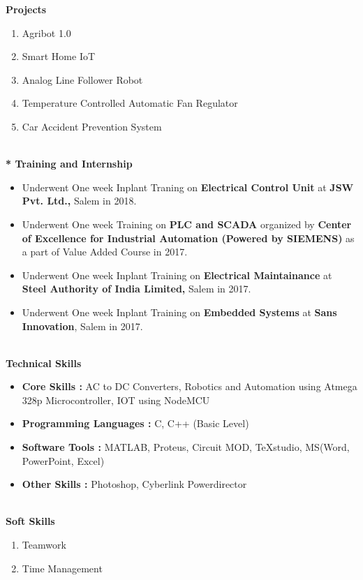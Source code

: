 \documentclass{article}
\begin{document}
	\begin{flushleft}
		\large \textbf{Projects}
		\begin{enumerate}
				\setlength\itemsep{0.01em}
			\item Agribot 1.0
			\item Smart Home IoT
			\item Analog Line Follower Robot
			\item Temperature Controlled Automatic Fan Regulator
			\item Car Accident Prevention System
		\end{enumerate}
		\large \textbf{\\* Training and Internship}\
		\begin{itemize}
		\justifying
			\setlength\itemsep{0.01em}
			\item Underwent One week Inplant Traning on \textbf{Electrical Control Unit} at \textbf{JSW Pvt. Ltd.,} Salem in 2018.
			\item Underwent One week Training on \textbf{PLC and SCADA} organized by \textbf{Center of Excellence for Industrial Automation (Powered by SIEMENS)} as a part of Value Added Course in 2017. 
			\item Underwent One week Inplant Training on \textbf{Electrical Maintainance} at \textbf{Steel Authority of India Limited,} Salem in 2017.
			\item Underwent One week Inplant Training on \textbf{Embedded Systems} at \textbf{Sans Innovation}, Salem in 2017. 
		\end{itemize}
		\large \textbf{\\Technical Skills}\
		\begin{itemize}
				\setlength\itemsep{0.01em}
			\item \textbf{Core Skills	:} AC to DC Converters,	Robotics and Automation using Atmega 328p Microcontroller, IOT using NodeMCU
			\item \textbf{Programming Languages	:}	C, C++ (Basic Level)
			\item \textbf{Software Tools	:}	MATLAB, Proteus, Circuit MOD, TeXstudio, MS(Word, PowerPoint, Excel)
			\item \textbf{Other Skills	:} Photoshop, Cyberlink Powerdirector
		\end{itemize}
		\large \textbf{\\Soft Skills}\
		\begin{enumerate}
				\setlength\itemsep{0.01em}
			\item Teamwork
			\item Time Management

\end{enumerate}
\end{flushleft}
\end{document}
